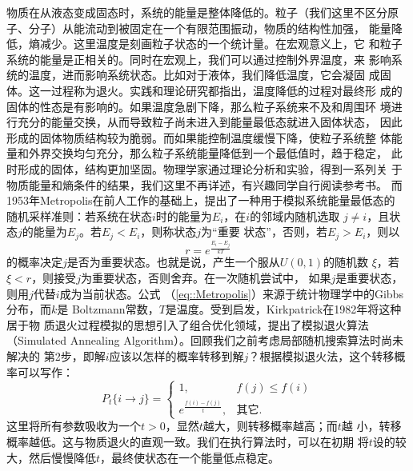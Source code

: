 物质在从液态变成固态时，系统的能量是整体降低的。粒子（我们这里不区分原
  子、分子）从能流动到被固定在一个有限范围振动，物质的结构性加强，
能量降低，熵减少。这里温度是刻画粒子状态的一个统计量。在宏观意义上，它
和粒子系统的能量是正相关的。同时在宏观上，我们可以通过控制外界温度，来
影响系统的温度，进而影响系统状态。比如对于液体，我们降低温度，它会凝固
成固体。这一过程称为退火。实践和理论研究都指出，温度降低的过程对最终形
成的固体的性态是有影响的。如果温度急剧下降，那么粒子系统来不及和周围环
境进行充分的能量交换，从而导致粒子尚未进入到能量最低态就进入固体状态，
因此形成的固体物质结构较为脆弱。而如果能控制温度缓慢下降，使粒子系统整
体能量和外界交换均匀充分，那么粒子系统能量降低到一个最低值时，趋于稳定，
此时形成的固体，结构更加坚固。物理学家通过理论分析和实验，得到一系列关
于物质能量和熵条件的结果，我们这里不再详述，有兴趣同学自行阅读参考书。
而1953年Metropolis在前人工作的基础上，提出了一种用于模拟系统能量最低态的
随机采样准则：若系统在状态$i$时的能量为$E_i$，在$i$的邻域内随机选取
$j\neq i$，且状态$j$的能量为$E_j$。若$E_j < E_i$，则称状态$j$为“重要
状态”，否则，若$E_j > E_i$，则以
\begin{equation}
  r = e^{\frac{E_i - E_j}{kT}}
  \label{eq::Metropolis}
\end{equation}
的概率决定$j$是否为重要状态。也就是说，产生一个服从$U(0, 1)$的随机数
$\xi$，若$\xi < r$，则接受$j$为重要状态，否则舍弃。在一次随机尝试中，
如果$j$是重要状态，则用$j$代替$i$成为当前状态。公式
（\ref{eq::Metropolis}）来源于统计物理学中的Gibbs分布，而$k$是
Boltzmann常数，$T$是温度。受到启发，Kirkpatrick在1982年将这种居于物
质退火过程模拟的思想引入了组合优化领域，提出了模拟退火算法（Simulated
  Annealing Algorithm）。回顾我们之前考虑局部随机搜索算法时尚未解决的
第2步，即解$i$应该以怎样的概率转移到解$j$？根据模拟退火法，这个转移概
率可以写作：
\begin{equation}
  P_t\{i \to j\} = \left\{
  \begin{array}{ll}
    1, & f(j) \leq f(i)\\
    e^{\frac{f(i) - f(j)}{t}}, &\mbox{其它}.
  \end{array}
  \right.
  \label{eq::SAA_metro}
\end{equation}
这里将所有参数吸收为一个$t > 0$，显然$t$越大，则转移概率越高；而$t$越
小，转移概率越低。这与物质退火的直观一致。我们在执行算法时，可以在初期
将$t$设的较大，然后慢慢降低$t$，最终使状态在一个能量低点稳定。
